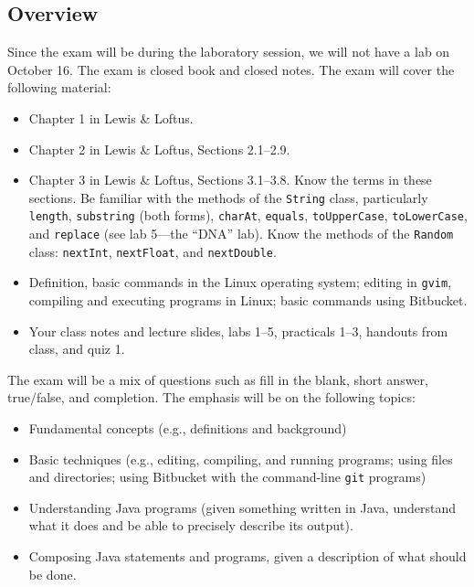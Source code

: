 


\subsection*{Overview}

Since the exam will be during the laboratory session, we will not have a
lab on October 16. The exam is closed book and closed notes. The exam will
cover the following material:

\begin{itemize}
\item
Chapter 1 in Lewis \& Loftus. 
\item
Chapter 2 in Lewis \& Loftus, Sections 2.1--2.9. 
\item 
Chapter 3 in Lewis \& Loftus, Sections 3.1--3.8.
Know the terms in these sections. Be familiar with the methods of the {\tt String}
class, particularly {\tt length}, {\tt substring} (both forms), 
{\tt charAt}, {\tt equals}, {\tt toUpperCase}, {\tt toLowerCase}, and {\tt replace}
(see lab 5---the ``DNA'' lab).
Know the methods of the {\tt Random} class: {\tt nextInt}, {\tt nextFloat}, and {\tt nextDouble}.
\item
Definition, basic commands in the Linux
operating system; editing in {\tt gvim}, compiling and executing programs
in Linux; basic commands using Bitbucket.
\item
Your class notes and lecture slides, labs 1--5, practicals 1--3, handouts from class, and quiz 1.
\end{itemize}

\noindent The exam will be a mix of questions such as fill in the blank, short answer, true/false, and completion.  The
emphasis will be on the following topics:

\begin{itemize}
\item
Fundamental concepts (e.g., definitions and background)
\item
Basic techniques (e.g., editing, compiling, and running programs; using
  files and directories; using Bitbucket with the command-line {\tt git} programs)
\item
Understanding Java programs (given something written in Java, understand
what it does and be able to precisely describe its output).
\item
Composing Java statements and programs, given a description of what
should be done.
\end{itemize}


